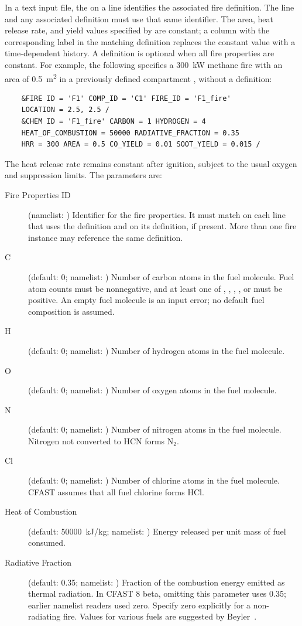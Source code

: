 {{In a text input file, the  on a  line identifies the associated fire definition. The  line and any associated  definition must use that same identifier. The area, heat release rate, and yield values specified by  are constant; a column with the corresponding label in the matching  definition replaces the constant value with a time-dependent history. A  definition is optional when all fire properties are constant. For example, the following specifies a 300~kW methane fire with an area of 0.5~\unit{m^2} in a previously defined compartment , without a  definition:
\begin{verbatim}
    &FIRE ID = 'F1' COMP_ID = 'C1' FIRE_ID = 'F1_fire'
    LOCATION = 2.5, 2.5 /
    &CHEM ID = 'F1_fire' CARBON = 1 HYDROGEN = 4
    HEAT_OF_COMBUSTION = 50000 RADIATIVE_FRACTION = 0.35
    HRR = 300 AREA = 0.5 CO_YIELD = 0.01 SOOT_YIELD = 0.015 /
\end{verbatim}
The heat release rate remains constant after ignition, subject to the usual oxygen and suppression limits. The  parameters are:
\begin{description}
    \item[Fire Properties ID] (namelist: ) Identifier for the fire properties. It must match  on each  line that uses the definition and  on its  definition, if present. More than one fire instance may reference the same definition.
    \item[C] (default: 0; namelist: ) Number of carbon atoms in the fuel molecule. Fuel atom counts must be nonnegative, and at least one of , , , , or  must be positive. An empty fuel molecule is an input error; no default fuel composition is assumed.
    \item[H] (default: 0; namelist: ) Number of hydrogen atoms in the fuel molecule.
    \item[O] (default: 0; namelist: ) Number of oxygen atoms in the fuel molecule.
    \item[N] (default: 0; namelist: ) Number of nitrogen atoms in the fuel molecule. Nitrogen not converted to HCN forms N$_2$.
    \item[Cl] (default: 0; namelist: ) Number of chlorine atoms in the fuel molecule. CFAST assumes that all fuel chlorine forms HCl.
    \item[Heat of Combustion] (default: 50000~kJ/kg; namelist: ) Energy released per unit mass of fuel consumed.
    \item[Radiative Fraction] (default: 0.35; namelist: ) Fraction of the combustion energy emitted as thermal radiation. In CFAST 8 beta, omitting this parameter uses 0.35; earlier namelist readers used zero. Specify zero explicitly for a non-radiating fire. Values for various fuels are suggested by Beyler~\cite{Beyler2:SFPE}.
\end{description}

}}
